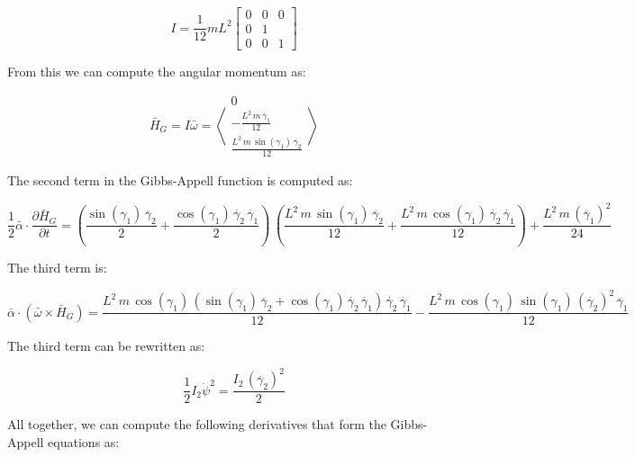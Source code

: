 \documentclass[12pt, letterpaper]{../assignment}
\begin{document}
$$ I = \frac{1}{12} m L^2 \left[\begin{array}{ccc}
0 & 0 & 0\\
0 & 1\\
0 & 0 & 1
\end{array}\right] $$

From this we can compute the angular momentum as:

$$ \bar{H}_G = I \bar{\omega} = \left<\begin{array}{c} 0\\ -\frac{L^2\,m\,\dot{\gamma_1}}{12}\\ \frac{L^2\,m\,\sin\left(\gamma _{1}\right)\,\dot{\gamma_2}}{12} \end{array}\right> $$

The second term in the Gibbs-Appell function is computed as:

$$ \frac{1}{2} \bar{\alpha} \cdot \frac{\partial \bar{H}_G}{\partial t} = 
\left(\frac{\sin\left(\gamma _{1}\right)\,\ddot{\gamma_2}}{2}+\frac{\cos\left(\gamma _{1}\right)\,\dot{\gamma_2}\,\dot{\gamma_1}}{2}\right)\,\left(\frac{L^2\,m\,\sin\left(\gamma _{1}\right)\,\ddot{\gamma_2}}{12}+\frac{L^2\,m\,\cos\left(\gamma _{1}\right)\,\dot{\gamma_2}\,\dot{\gamma_1}}{12}\right)+\frac{L^2\,m\,{\left(\ddot{\gamma_1}\right)}^2}{24}$$

The third term is:

$$ \bar{\alpha} \cdot \left( \bar{\omega} \times \bar{H}_G \right) = 
\frac{L^2\,m\,\cos\left(\gamma _{1}\right)\,\left(\sin\left(\gamma _{1}\right)\,\ddot{\gamma_2}+\cos\left(\gamma _{1}\right)\,\dot{\gamma_2}\,\dot{\gamma_1}\right)\,\dot{\gamma_2}\,\dot{\gamma_1}}{12}-\frac{L^2\,m\,\cos\left(\gamma _{1}\right)\,\sin\left(\gamma _{1}\right)\,{\left(\dot{\gamma_2}\right)}^2\,\ddot{\gamma_1}}{12} $$

The third term can be rewritten as:

$$ \frac{1}{2} I_2 \ddot{\psi}^2 = 
\frac{I_{2}\,{\left(\ddot{\gamma_2}\right)}^2}{2}$$

All together, we can compute the following derivatives that form the Gibbs-Appell equations as:
\end{document}
